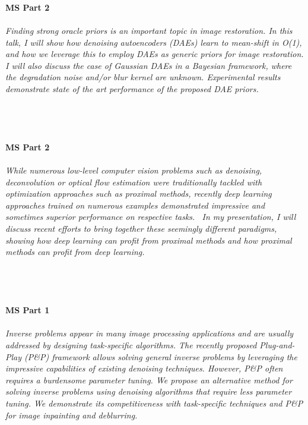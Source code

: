 \begin{multicols}{2}
    \\
    \\\\
    \noindent\textbf{MS Part 2}\\
\\  
    \textit{Finding strong oracle priors is an important topic in image restoration. In this talk, I will show how denoising autoencoders (DAEs) learn to mean-shift in O(1), and how we leverage this to employ DAEs as  generic priors for image restoration. I will also discuss the case of Gaussian DAEs in a Bayesian framework, where the degradation noise and/or blur kernel are unknown. Experimental results demonstrate state of the art performance of the proposed DAE priors.}\\
\\ 
    \\
    \\\\
    \noindent\textbf{MS Part 2}\\
\\  
    \textit{While numerous low-level computer vision problems such as denoising, deconvolution or optical flow estimation were traditionally tackled with optimization approaches such as proximal methods, recently deep learning approaches trained on numerous examples demonstrated impressive and sometimes superior performance on respective tasks.
\
In my presentation, I will discuss recent efforts to bring together these seemingly different paradigms, showing how deep learning
can profit from proximal methods and how proximal methods can profit from deep learning.}\\
\\ 
    \\
    \\\\
    \noindent\textbf{MS Part 1}\\
\\  
    \textit{Inverse problems appear in many image processing applications and are usually addressed by designing task-specific algorithms. The recently proposed Plug-and-Play (P\&P) framework allows solving general inverse problems by leveraging the impressive capabilities of existing denoising techniques. However, P\&P often requires a burdensome parameter tuning. We propose an alternative method for solving inverse problems using denoising algorithms that require less parameter tuning. We demonstrate its competitiveness with task-specific techniques and P\&P for image inpainting and deblurring.}\\

\end{multicols}
